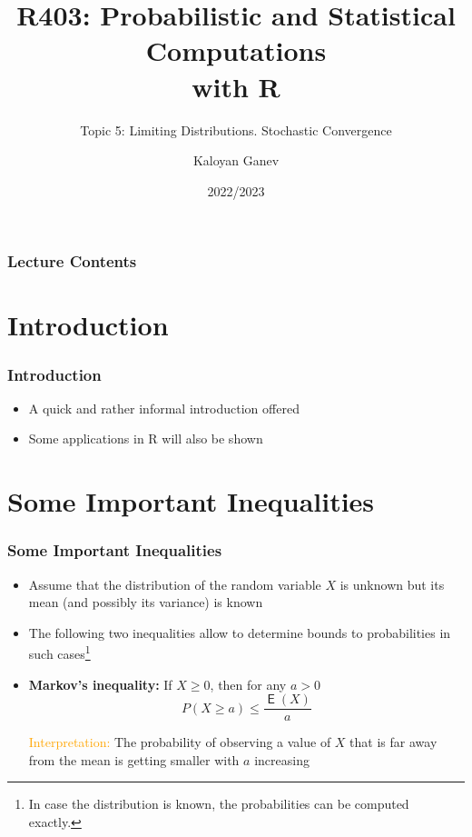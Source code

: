 \documentclass[10pt]{beamer}
\title{R403: Probabilistic and Statistical Computations\\ with R}
\subtitle{Topic 5: \textcolor{myred}{Limiting Distributions. Stochastic Convergence}}
\author{Kaloyan Ganev}
\date{2022/2023}
\DeclareMathOperator{\E}{\mathsf{E}}
\theoremstyle{definition}
\begin{document}
\maketitle

\begin{frame}[fragile]
\frametitle{Lecture Contents}
\tableofcontents
\end{frame}

\section{Introduction}
\begin{frame}[fragile]
	\frametitle{Introduction}
	\begin{itemize}
		\item A quick and rather informal introduction offered
		
		\item Some applications in R will also be shown
	\end{itemize}
\end{frame}

\section{Some Important Inequalities}
\begin{frame}[fragile]
	\frametitle{Some Important Inequalities}
	\begin{itemize}
		\item Assume that the distribution of the random variable $ X $ is unknown but its mean (and possibly its variance) is known
		
		\item The following two inequalities allow to determine bounds to probabilities in such cases\footnote{In case the distribution is known, the probabilities can be computed exactly.}
		
		\item \textbf{Markov's inequality:} If $ X \geq 0 $, then for any $ a > 0 $
		\[
			P(X \geq a) \leq \dfrac{\E(X)}{a}
		\]
		
		\textcolor{orange}{Interpretation:} The probability of observing a value of $ X $ that is far away from the mean is getting smaller with $ a $ increasing
	\end{itemize}
\end{frame}
\end{document}

